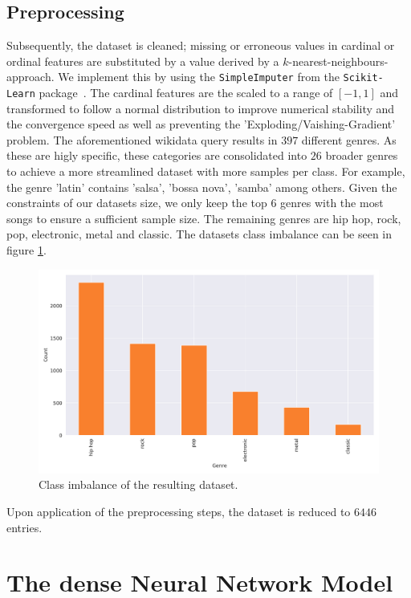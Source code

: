 \documentclass[
  12pt,
  bibliography=totoc,     %
  captions=tableheading,  %
  titlepage=firstiscover, %
]{scrartcl}
\begin{document}
\subsection{Preprocessing}
Subsequently, the dataset is cleaned; missing or erroneous values
in cardinal or ordinal features are substituted by a value derived by a $k$-nearest-neighbours-approach. We implement this
by using the \texttt{SimpleImputer} from the \texttt{Scikit-Learn} package~\cite{scikit-learn}.
The cardinal features are the scaled to a range of $[-1,1]$ and transformed to follow a normal distribution to improve numerical stability
and the convergence speed as well as preventing the 'Exploding/Vaishing-Gradient' problem.
The aforementioned wikidata query results in $397$ different genres. As these are higly specific, these categories are consolidated into $26$ broader genres to
achieve a more streamlined dataset with more samples per class. For example, the genre 'latin' contains 'salsa', 'bossa nova', 'samba' among others.
Given the constraints of our datasets size, we only keep the top $6$ genres with the most songs to ensure a sufficient sample
size. The remaining genres are hip hop, rock, pop, electronic, metal and classic. The datasets class imbalance can be seen in figure \ref{fig:class-imbalance}.
\FloatBarrier
\begin{figure}[h]
  \centering
  \includegraphics[scale=0.5]{figures/genre_hist_orange.pdf}
  \caption{Class imbalance of the resulting dataset.}
  \label{fig:class-imbalance}
\end{figure}
\FloatBarrier
Upon application of the preprocessing steps, the dataset is reduced to $6446$ entries.
\section{The dense Neural Network Model}
\end{document}
